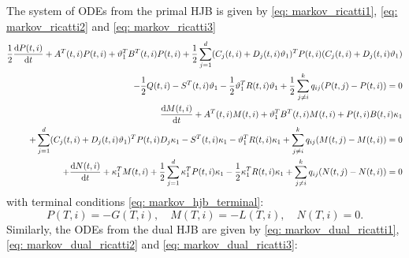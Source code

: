 The system of ODEs from the primal HJB is given by \eqref{eq: markov_ricatti1}, \eqref{eq: markov_ricatti2} and \eqref{eq: markov_ricatti3}
\begin{align*}
    \frac12 \frac{\mathop{}\!\mathrm{d} P(t,i)}{\mathop{}\!\mathrm{d} t} + A^T(t,i) P(t,i) + \vartheta_1^T B^T(t,i) P(t,i) + \frac12 \sum_{j=1}^d (C_j(t,i) + D_j(t,i) \vartheta_1)^T P(t,i) (C_j(t,i) +   D_j(t,i) \vartheta_1)\\
    - \frac12 Q(t,i) - S^T(t,i) \vartheta_1 - \frac12 \vartheta_1^T R(t,i) \vartheta_1     + \frac12 \sum_{j \ne i}^k q_{ij} (P(t,j) - P(t,i)) = 0 \\
    \frac{\mathop{}\!\mathrm{d} M(t,i)}{\mathop{}\!\mathrm{d} t} + A^T(t,i) M(t,i) +  \vartheta_1^T B^T(t,i) M(t,i) +  P(t,i) B(t,i) \kappa_1 \\
    + \sum_{j=1}^d (C_j(t,i) + D_j(t,i) \vartheta_1)^T P(t,i) D_j 
    \kappa_1  - S^T(t,i) \kappa_1 - \vartheta_1^T R(t,i) \kappa_1 + \sum_{j \ne i}^k q_{ij} (M(t,j) - M(t,i)) = 0 \\
    + \frac{\mathop{}\!\mathrm{d} N(t,i)}{\mathop{}\!\mathrm{d} t} + \kappa_1^T M(t,i) + \frac12 \sum_{j=1}^d \kappa_1^T P(t,i) \kappa_1 - \frac12 \kappa_1^T R(t,i) \kappa_1+ \sum_{j \ne i}^k q_{ij}(N(t,j) - N(t,i)) = 0 
\end{align*}
with terminal conditions \eqref{eq: markov_hjb_terminal}:
\begin{equation*}
    P(T,i) = -G(T,i), \quad M(T,i) = - L(T,i), \quad N(T, i) = 0.
\end{equation*}
Similarly, the ODEs from the dual HJB are given by \eqref{eq: markov_dual_ricatti1}, \eqref{eq: markov_dual_ricatti2} and \eqref{eq: markov_dual_ricatti3}:
